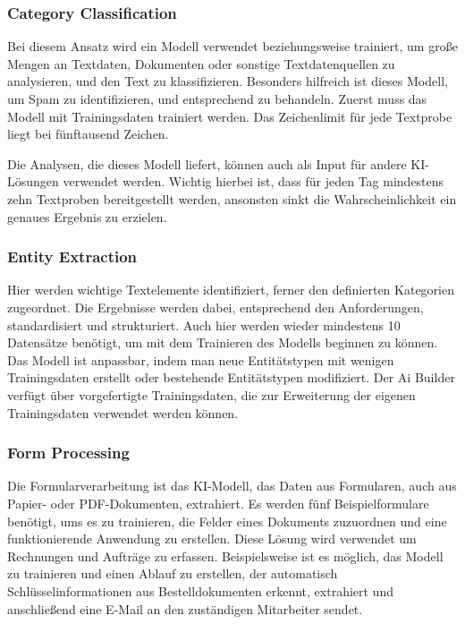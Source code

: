 \subsubsection{Category Classification}

Bei diesem Ansatz wird ein Modell verwendet beziehungsweise trainiert, um große Mengen an Textdaten, Dokumenten oder sonstige Textdatenquellen zu analysieren, und den Text zu klassifizieren. Besonders hilfreich ist dieses Modell, um Spam zu identifizieren, und entsprechend zu behandeln. Zuerst muss das Modell mit Trainingsdaten trainiert werden. Das Zeichenlimit für jede Textprobe liegt bei fünftausend Zeichen.

Die Analysen, die dieses Modell liefert, können auch als Input für andere KI-Lösungen verwendet werden. Wichtig hierbei ist, dass für jeden Tag mindestens zehn Textproben bereitgestellt werden, ansonsten sinkt die Wahrscheinlichkeit ein genaues Ergebnis zu erzielen.

\subsubsection{Entity Extraction}

Hier werden wichtige Textelemente identifiziert, ferner den definierten Kategorien zugeordnet. Die Ergebnisse werden dabei, entsprechend den Anforderungen, standardisiert und strukturiert. Auch hier werden wieder mindestens 10 Datensätze benötigt, um mit dem Trainieren des Modells beginnen zu können. Das Modell ist anpassbar, indem man neue Entitätstypen mit wenigen Trainingsdaten erstellt oder bestehende Entitätstypen modifiziert. Der Ai Builder verfügt über vorgefertigte Trainingsdaten, die zur Erweiterung der eigenen Trainingsdaten verwendet werden können.

\subsubsection{Form Processing}

Die Formularverarbeitung ist das KI-Modell, das Daten aus Formularen, auch aus Papier- oder PDF-Dokumenten, extrahiert. Es werden fünf Beispielformulare benötigt, ums es zu trainieren, die Felder eines Dokuments zuzuordnen und eine funktionierende Anwendung zu erstellen. Diese Lösung wird verwendet um Rechnungen und Aufträge zu erfassen. Beispielsweise ist es möglich, das Modell zu trainieren und einen Ablauf zu erstellen, der automatisch Schlüsselinformationen aus Bestelldokumenten erkennt, extrahiert und anschließend eine E-Mail an den zuständigen Mitarbeiter sendet.


